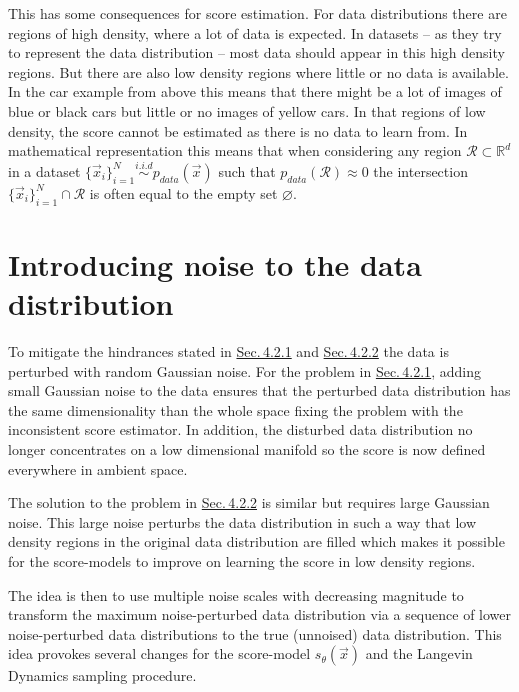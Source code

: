 This has some consequences for score estimation. For data distributions there are regions of high density, where a lot of data is expected. In datasets – as they try to represent the data distribution – most data should appear in this high density regions. But there are also low density regions where little or no data is available. In the car example from above this means that there might be a lot of images of blue or black cars but little or no images of yellow cars. In that regions of low density, the score cannot be estimated as there is no data to learn from. In mathematical representation this means that when considering any region $\mathcal{R}\subset\mathbb{R}^d$ in a dataset $\{\vec{x}_i\}_{i=1}^N\overset{i.i.d}{\sim}p_{data}(\vec{x})$ such that $p_{data}(\mathcal{R})\approx0$ the intersection $\{\vec{x}_i\}_{i=1}^N\cap\mathcal{R}$ is often equal to the empty set $\varnothing$. 

\section[Introducing noise to the data distribution]{Introducing noise to the data distribution%
    } \label{sec:4.3}
To mitigate the hindrances stated in \hyperref[sec:4.2.1]{Sec.\,4.2.1} and \hyperref[sec:4.2.2]{Sec.\,4.2.2} the data is perturbed with random Gaussian noise. For the problem in \hyperref[sec:4.2.1]{Sec.\,4.2.1}, adding small Gaussian noise to the data ensures that the perturbed data distribution has the same dimensionality than the whole space fixing the problem with the inconsistent score estimator. In addition, the disturbed data distribution no longer concentrates on a low dimensional manifold so the score is now defined everywhere in ambient space.

The solution to the problem in \hyperref[sec:4.2.2]{Sec.\,4.2.2} is similar but requires large Gaussian noise. This large noise perturbs the data distribution in such a way that low density regions in the original data distribution are filled which makes it possible for the score-models to improve on learning the score in low density regions.

The idea is then to use multiple noise scales with decreasing magnitude to transform the maximum noise-perturbed data distribution via a sequence of lower noise-perturbed data distributions to the true (unnoised) data distribution. This idea provokes several changes for the score-model $s_\theta(\vec{x})$ and the Langevin Dynamics sampling procedure. 
%
